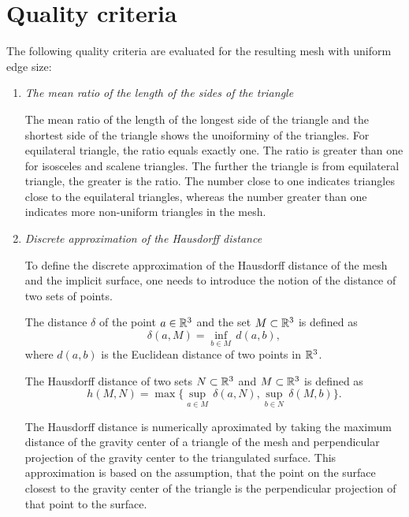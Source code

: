 \section{Quality criteria}
\label{sub4.1}

The following quality criteria \cite{korecova2021triangulation} are evaluated 
for the resulting mesh with uniform edge size:

\begin{enumerate}
    \item \textit{The mean ratio of the length of the sides of the triangle}
    
    The mean ratio of the length of the longest side of the triangle
    and the shortest side of the triangle shows the unoiforminy of the 
    triangles. 
    For equilateral triangle, the ratio equals exactly one. The ratio is
    greater than one for isosceles and scalene triangles. 
    The further the triangle is from equilateral triangle, the greater is the ratio.
    The number close to one indicates triangles close to the equilateral triangles,
    whereas the number greater than one indicates more non-uniform triangles in the mesh.

    \item \textit{Discrete approximation of the Hausdorff distance}
    
    To define the discrete approximation of the Hausdorff distance of the mesh and
    the implicit surface, one needs to introduce the notion of the distance of two sets
    of points.
\begin{definition} The distance $\delta$ of the point $a\in \mathbb{R}^3$ and the set
    $M \subset \mathbb{R}^3$ is defined as 
    \begin{equation}
        \delta(a, M) = \inf_{b \in M} \, d(a, b),
    \end{equation}
    where $d(a, b)$ is the Euclidean distance of two points in $\mathbb{R}^3$. 
\end{definition}
\begin{definition} The Hausdorff distance of two sets $N \subset \mathbb{R}^3$ and
    $M \subset \mathbb{R}^3$ is defined as
    \begin{equation}
        h(M, N) = \max \big \{\sup_{a \in M} \, \delta(a, N), \sup_{b \in N} \, \delta(M, b) \big \}.
    \end{equation}
\end{definition}
    The Hausdorff distance is numerically aproximated by taking the maximum distance
    of the gravity center of a triangle of the mesh and perpendicular projection of
    the gravity center to the triangulated surface.
    This approximation is based on the assumption, that the point on the surface
    closest to the gravity center of the triangle is the perpendicular projection of
    that point to the surface.


\end{enumerate}
